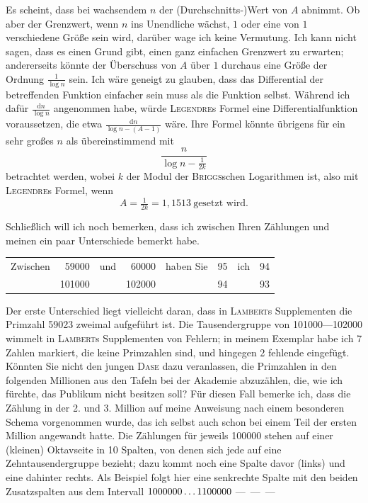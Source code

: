 Es scheint, dass bei wachsendem $n$ der (Durchschnitts-)Wert von $A$ abnimmt. Ob aber der Grenzwert, wenn $n$ ins Unendliche wächst, $1$ oder eine von $1$ verschiedene Größe sein wird, darüber wage ich keine Vermutung. Ich kann nicht sagen, dass es einen Grund gibt, einen ganz einfachen Grenzwert zu erwarten; andererseits könnte der Überschuss von $A$ über $1$ durchaus eine Größe der Ordnung $\frac{1}{\log n}$ sein. Ich wäre geneigt zu glauben, dass das Differential der betreffenden Funktion einfacher sein muss als die Funktion selbst. Während ich dafür $\frac{\mathrm{d}n}{\log n}$ angenommen habe, würde \textsc{Legendre}s Formel eine Differentialfunktion voraussetzen, die etwa $\frac{\mathrm{d}n}{\log n-(A-1)}$ wäre. Ihre Formel könnte übrigens für ein sehr großes $n$ als übereinstimmend mit
\begingroup{}
\[
\frac{n}{\log n-\frac{1}{2k}}
\]
betrachtet werden, wobei $k$ der Modul der \textsc{Briggs}schen Logarithmen ist, also mit \textsc{Legendre}s Formel, wenn
\[
A=\tfrac{1}{2k}=1{,}1513\ \text{gesetzt wird.}
\]
\endgroup

Schließlich will ich noch bemerken, dass ich zwischen Ihren Zählungen und meinen ein paar Unterschiede bemerkt habe.
\begin{center}
\begin{tabular}{lrlrlrlr}
Zwischen & 59000 & und & 60000 & haben Sie & 95 & ich & 94\\
 & 101000 & & 102000 & & 94 & & 93
\end{tabular}
\end{center}
Der erste Unterschied liegt vielleicht daran, dass in \textsc{Lambert}s Supplementen die Primzahl 59023 zweimal aufgeführt ist. Die Tausendergruppe von 101000—102000 wimmelt in \textsc{Lambert}s Supplementen von Fehlern; in meinem Exemplar habe ich 7 Zahlen markiert, die keine Primzahlen sind, und hingegen 2 fehlende eingefügt.
%
Könnten Sie nicht den jungen \textsc{Dase} dazu veranlassen, die Primzahlen in den folgenden Millionen aus den Tafeln bei der Akademie abzuzählen, die, wie ich fürchte, das Publikum nicht besitzen soll? Für diesen Fall bemerke ich, dass die Zählung in der 2. und 3. Million auf meine Anweisung nach einem besonderen Schema vorgenommen wurde, das ich selbst auch schon bei einem Teil der ersten Million angewandt hatte. Die Zählungen für jeweils 100000 stehen auf einer (kleinen) Oktavseite in 10 Spalten, von denen sich jede auf eine Zehntausendergruppe bezieht; dazu kommt noch eine Spalte davor (links) und eine dahinter rechts. Als Beispiel folgt hier eine senkrechte Spalte mit den beiden Zusatzspalten aus dem Intervall $1000000\mathinner{.\,.\,.}1100000$ \mbox{— — —}

